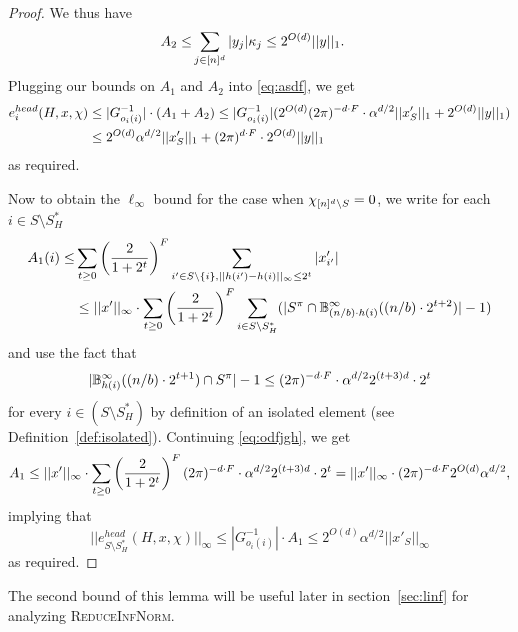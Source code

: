 \begin{proof}
We thus have
\begin{equation*}
\begin{split}
A_2\leq &\sum_{j\in {[n]^d}} |y_j|  \kappa_j\leq 2^{O(d)} ||y||_1.
\end{split}
\end{equation*}
Plugging our bounds on $A_1$ and $A_2$ into \eqref{eq:asdf}, we get
\begin{equation*}
\begin{split}
e^{head}_{i}(H, x, \chi)&\leq |G_{o_i(i)}^{-1}|\cdot (A_1+A_2)\leq |G_{o_i(i)}^{-1}|(2^{O(d)}(2\pi)^{-d\cdot F}\cdot \alpha^{d/2} ||x'_S||_1+2^{O(d)}||y||_1)\\
&\leq 2^{O(d)}\alpha^{d/2} ||x'_S||_1+(2\pi)^{d\cdot F} \cdot 2^{O(d)} ||y||_1\\
\end{split}
\end{equation*}
as required.

Now to obtain the $\ell_\infty$ bound for the case when $\chi_{{[n]^d}\setminus S}=0$, we write for each $i\in S\setminus S^*_H$
\begin{equation}\label{eq:odfjgh}
\begin{split}
A_1(i)\leq &\sum_{t\geq 0} \left(\frac2{1+2^t}\right)^{F} \sum_{i'\in S\setminus \{i\}, ||h(i')-h(i)||_\infty\leq 2^t} |x'_{i'}|\\
&\leq ||x'||_\infty\cdot \sum_{t\geq 0} \left(\frac2{1+2^t}\right)^{F} \sum_{i\in S\setminus S^*_H}(|S^\pi\cap \mathbb{B}^\infty_{(n/b)\cdot h(i)}((n/b)\cdot 2^{t+2})|-1)\\
\end{split}
\end{equation}
and use the fact that 
$$
|\mathbb{B}^\infty_{h(i)}((n/b)\cdot 2^{t+1})\cap S^\pi|-1\leq (2\pi)^{-d\cdot F}\cdot \alpha^{d/2} 2^{(t+3)d}\cdot 2^{t}
$$
for every $i\in (S\setminus S^*_H)$ by definition of an isolated element (see Definition~\ref{def:isolated}). Continuing \eqref{eq:odfjgh}, we get
\begin{equation*}
\begin{split}
A_1\leq ||x'||_\infty\cdot \sum_{t\geq 0} \left(\frac2{1+2^t}\right)^{F}(2\pi)^{-d\cdot F}\cdot \alpha^{d/2} 2^{(t+3)d}\cdot 2^{t}=||x'||_\infty\cdot (2\pi)^{-d\cdot F} 2^{O(d)} \alpha^{d/2},\\
\end{split}
\end{equation*}
implying that 
$$
||e^{head}_{S\setminus S^*_H}(H, x, \chi)||_\infty\leq |G_{o_i(i)}^{-1}|\cdot  A_1\leq 2^{O(d)}\alpha^{d/2} ||x'_S||_\infty
$$
as required.
\fi 
\end{proof}
\begin{remark}
The second bound of this lemma will be useful later in section~\ref{sec:linf} for analyzing \textsc{ReduceInfNorm}.
\end{remark}


